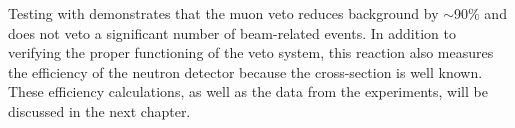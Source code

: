 Testing with \MgReaction demonstrates that the muon veto reduces background by $\sim$90\% and does not veto a significant number of beam-related events.  In addition to verifying the proper functioning of the veto system, this reaction also measures the efficiency of the neutron detector because the cross-section is well known.  These efficiency calculations, as well as the data from the \GeTargets experiments, will be discussed in the next chapter.


%
% 
% 
